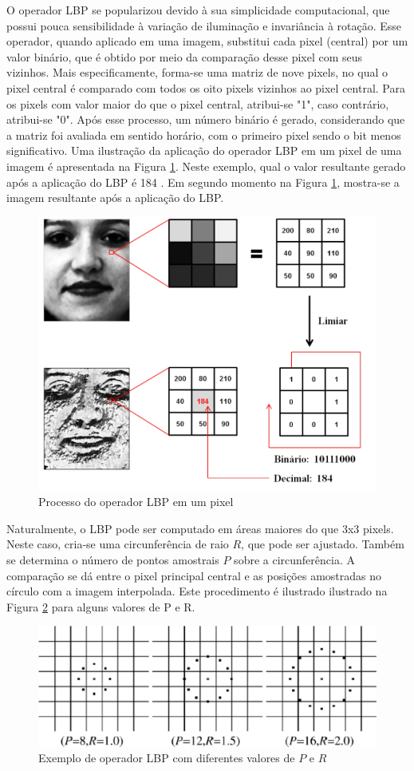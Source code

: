 O operador LBP se popularizou devido à sua simplicidade computacional, que possui pouca sensibilidade à variação de iluminação e invariância à rotação. Esse operador, quando aplicado em uma imagem, substitui cada pixel (central) por um valor binário, que é obtido por meio da comparação desse pixel com seus vizinhos. Mais especificamente, forma-se uma matriz de nove pixels, no qual o pixel central é comparado com todos os oito pixels vizinhos ao pixel central. Para os pixels com valor maior do que o pixel central, atribui-se "1", caso contrário, atribui-se "0". Após esse processo, um número binário é gerado, considerando que a matriz foi avaliada em sentido horário, com o primeiro pixel sendo o bit menos significativo. Uma ilustração da aplicação do operador LBP em um pixel de uma imagem é apresentada na Figura \ref{fig:lbpTeoria}. Neste exemplo, qual o valor resultante gerado após a aplicação do LBP é 184 . Em segundo momento na Figura \ref{fig:lbpTeoria}, mostra-se a imagem resultante após a aplicação do LBP.

\begin{figure}[H]
 \centering
  \includegraphics[width=0.65\linewidth]{figuras/lbpTeoria.pdf}
  \caption{Processo do operador LBP em um pixel }
  \label{fig:lbpTeoria}
\end{figure}

Naturalmente, o LBP pode ser computado em áreas maiores do que 3x3 pixels. Neste caso, cria-se uma circunferência de raio $R$, que pode ser ajustado. Também se determina o número de pontos amostrais $P$ sobre a circunferência. A comparação se dá entre o pixel principal central e as posições amostradas no círculo com a imagem interpolada. Este procedimento é ilustrado ilustrado na Figura \ref{fig:lbpTeoria2} para alguns valores de P e R.


\begin{figure}[H]
 \centering
  \includegraphics[width=0.65\linewidth]{figuras/lbpRP.pdf}
  \caption{Exemplo de operador LBP com diferentes valores de $P$ e $R$ }
  \label{fig:lbpTeoria2}
\end{figure}

